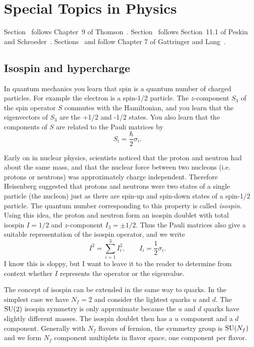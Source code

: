 \chapter{Special Topics in Physics}\label{ap:spec_phys}
Section~ follows Chapter~9 of 
Thomson~\cite{thomson_modern_2013}. 
Section~ follows Section~11.1 of Peskin and 
Schroeder~\cite{peskin_introduction_1995}.
Sections~ and 
 follow Chapter 7 of Gattringer and 
Lang~\cite{gattringer_quantum_2010}. 

\section{Isospin and hypercharge}\label{sec:isohyper}
In quantum mechanics you learn that spin is a quantum number of
charged particles. For example the electron is a spin-1/2 particle. The
$z$-component $S_3$ of the spin operator $S$ commutes with the Hamiltonian, and
you learn that the eigenvectors of $S_3$ are the +1/2 and -1/2 states. You also
learn that the components of $S$ are related to the Pauli matrices by
\begin{equation}
  S_i=\frac{\hbar}{2}\sigma_i.
\end{equation}

Early on in nuclear physics, scientists noticed that the proton and neutron had
about the same mass, and that the nuclear force between two nucleons (i.e.
protons or neutrons) was approximately charge independent. Therefore Heisenberg
suggested that protons and neutrons were two states of a single particle (the
nucleon) just as there are spin-up and spin-down states of a spin-1/2
particle.
The quantum number corresponding to this property is called {\it isospin}.
Using this idea, the proton and neutron form an isospin doublet with total
isospin $I=1/2$ and $z$-component $I_3=\pm1/2$. Thus the Pauli matrices also
give a suitable representation of the isospin operator, and we write
\begin{equation}
  I^2=\sum\limits_{i=1}^3 I_i^2, \qquad I_i=\frac{1}{2}\sigma_i.
\end{equation}
I know this is sloppy, but I want to leave it to the reader to determine from
context whether $I$ represents the operator or the eigenvalue. 

The concept of isospin can be extended in the same way to quarks. 
In the simplest case we have $N_f=2$ and consider the lightest quarks
$u$ and $d$. The $\operatorname{SU}(2)$ isospin symmetry is only approximate because 
the $u$ and $d$ quarks have slightly different masses. The isospin 
doublet then has a $u$ component and a $d$ component. Generally with
$N_f$ flavors of fermion, the symmetry group is $\operatorname{SU}(N_f)$ and we
form $N_f$ component multiplets in flavor space, one component per flavor.

